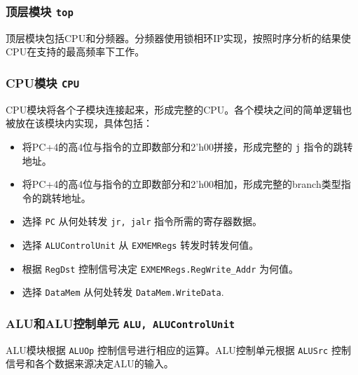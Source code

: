 \subsubsection{顶层模块 \lstinline|top|}
顶层模块包括CPU和分频器。分频器使用锁相环IP实现，按照时序分析的结果使CPU在支持的最高频率下工作。
\subsubsection{CPU模块 \lstinline|CPU|}
CPU模块将各个子模块连接起来，形成完整的CPU。各个模块之间的简单逻辑也被放在该模块内实现，具体包括：
\begin{itemize}
    \item 将PC+4的高4位与指令的立即数部分和2'h00拼接，形成完整的 \lstinline|j| 指令的跳转地址。
    \item 将PC+4的高4位与指令的立即数部分和2'h00相加，形成完整的branch类型指令的跳转地址。
    \item 选择 \lstinline|PC| 从何处转发 \lstinline|jr, jalr| 指令所需的寄存器数据。
    \item 选择 \lstinline|ALUControlUnit| 从 \lstinline|EXMEMRegs| 转发时转发何值。
    \item 根据 \lstinline|RegDst| 控制信号决定 \lstinline|EXMEMRegs.RegWrite_Addr| 为何值。
    \item 选择 \lstinline|DataMem| 从何处转发 \lstinline|DataMem.WriteData|.
\end{itemize}

\subsubsection{ALU和ALU控制单元 \lstinline|ALU, ALUControlUnit|}
ALU模块根据 \lstinline|ALUOp| 控制信号进行相应的运算。ALU控制单元根据 \lstinline|ALUSrc| 控制信号和各个数据来源决定ALU的输入。
